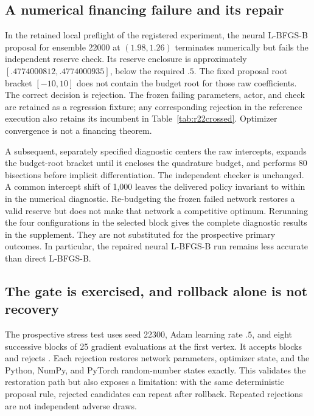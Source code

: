 \subsection{A numerical financing failure and its repair}\label{sec:r22root}
In the retained local preflight of the registered experiment, the neural L-BFGS-B proposal for ensemble 22000 at $(1.98,1.26)$ terminates numerically but fails the independent reserve check. Its reserve enclosure is approximately $[.4774000812,.4774000935]$, below the required $.5$. The fixed proposal root bracket $[-10,10]$ does not contain the budget root for those raw coefficients. The correct decision is rejection. The frozen failing parameters, actor, and check are retained as a regression fixture; any corresponding rejection in the reference execution also retains its incumbent in Table~\ref{tab:r22crossed}. Optimizer convergence is not a financing theorem.

A subsequent, separately specified diagnostic centers the raw intercepts, expands the budget-root bracket until it encloses the quadrature budget, and performs 80 bisections before implicit differentiation. The independent checker is unchanged. A common intercept shift of 1,000 leaves the delivered policy invariant to within \RXXIIShiftError{} in the numerical diagnostic. Re-budgeting the frozen failed network restores a valid reserve but does not make that network a competitive optimum. Rerunning the four configurations in the selected block gives the complete diagnostic results in the supplement. They are not substituted for the prospective primary outcomes. In particular, the repaired neural L-BFGS-B run remains less accurate than direct L-BFGS-B.

\subsection{The gate is exercised, and rollback alone is not recovery}\label{sec:r22stress}
The prospective stress test uses seed 22300, Adam learning rate $.5$, and eight successive blocks of 25 gradient evaluations at the first vertex. It accepts \RXXIIStressAccepted{} blocks and rejects \RXXIIStressRejected{}. Each rejection restores network parameters, optimizer state, and the Python, NumPy, and PyTorch random-number states exactly. This validates the restoration path but also exposes a limitation: with the same deterministic proposal rule, rejected candidates can repeat after rollback. Repeated rejections are not independent adverse draws.


